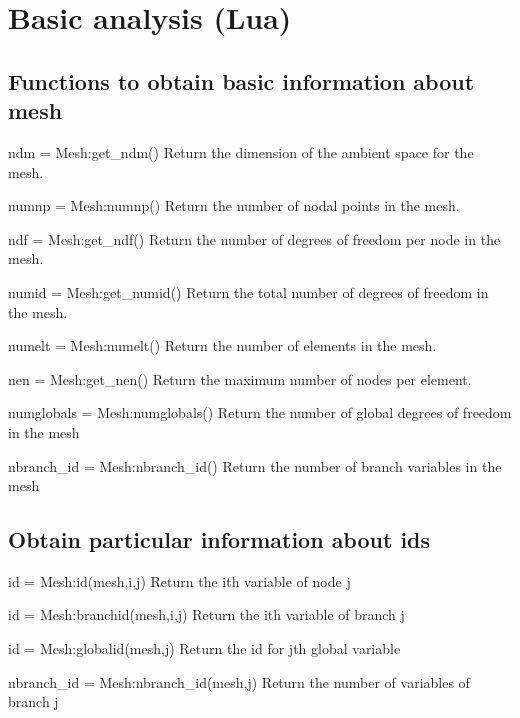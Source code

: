 \newpage
\section{Basic analysis (Lua)}
\subsection{Functions to obtain basic information about mesh}
\begin{codelist}

  \item[ndm = Mesh:get\_ndm()]
  Return the dimension of the ambient space for the mesh.

  \item[numnp = Mesh:numnp()]
  Return the number of nodal points in the mesh.

  \item[ndf = Mesh:get\_ndf()]
  Return the number of degrees of freedom per node in the mesh.

  \item[numid = Mesh:get\_numid()]
  Return the total number of degrees of freedom in the mesh.

  \item[numelt = Mesh:numelt()]
  Return the number of elements in the mesh.

  \item[nen = Mesh:get\_nen()]
  Return the maximum number of nodes per element.

  \item[numglobals = Mesh:numglobals()]
  Return the number of global degrees of freedom in the mesh

  \item[nbranch\_id = Mesh:nbranch\_id()]
  Return the number of branch variables in the mesh

\end{codelist}

\subsection{Obtain particular information about ids}
\begin{codelist}

  \item[id = Mesh:id(mesh,i,j)]
  Return the ith variable of node j

  \item[id = Mesh:branchid(mesh,i,j)]
  Return the ith variable of branch j

  \item[id = Mesh:globalid(mesh,j)]
  Return the id for jth global variable

  \item[nbranch\_id = Mesh:nbranch\_id(mesh,j)]
  Return the number of variables of branch j

\end{codelist}





